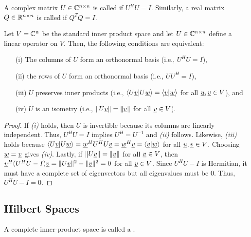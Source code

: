 \begin{definition}
A complex matrix $U\in \mathbb{C}^{n\times n}$ is called  if $U^H U = I$.
Similarly, a real matrix $Q\in \mathbb{R}^{n\times n}$ is called  if $Q^T Q = I$.
\end{definition}

\begin{theorem}
Let $V = \mathbb{C}^n$ be the standard inner product space and let  $U\in \mathbb{C}^{n\times n}$ define a linear operator on $V$.
Then, the following conditions are equivalent:
\begin{enumerate}
\item[(i)] The columns of $U$ form an orthonormal basis (i.e.,  $U^H U = I$),
\item[(ii)] the rows of $U$ form an orthonormal basis (i.e.,  $U U^H = I$),
\item[(iii)] $U$ preserves inner products (i.e., $\langle U \underline{v} | U \underline{w} \rangle = \langle \underline{v} | \underline{w} \rangle$ for all $\underline{u},\underline{v}\in V$), and
\item[(iv)] $U$ is an isometry (i.e., $\| U \underline{v} \| = \| \underline{v}\|$ for all $\underline{v} \in V$).
\end{enumerate}
\end{theorem}
\begin{proof}
If {\it(i)} holds, then $U$ is invertible because its columns are linearly independent.
Thus, $U^H U = I$ implies $U^H = U^{-1}$ and {\it(ii)} follows.
Likewise, {\it(iii)} holds because $\langle U \underline{v} | U \underline{w} \rangle = \underline{w}^H U^H U \underline{v} = \underline{w}^H \underline{v} = \langle \underline{v} | \underline{w} \rangle$ for all $\underline{u},\underline{v}\in V$.
Choosing $\underline{w}=\underline{v}$ gives {\it(iv)}.
Lastly, if $\| U \underline{v} \| = \| \underline{v}\|$ for all $\underline{v} \in V$, then
$\underline{v}^H (U^H U - I) \underline{v} = \| U \underline{v} \|^2 - \| \underline{v} \|^2 = 0$ for all $\underline{v} \in V$.
Since $U^H U - I$ is Hermitian, it must have a complete set of eigenvectors but all eigenvalues must be 0.  Thus, $U^H U - I = 0$.
\end{proof}

\subsection{Hilbert Spaces}

\begin{definition}
A complete inner-product space is called a .
\end{definition}

